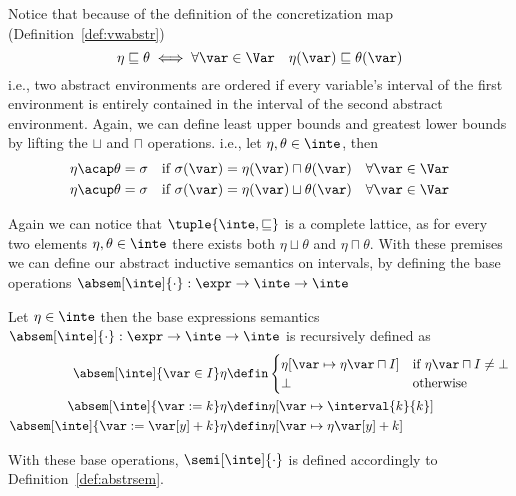 Notice that because of the definition of the concretization map
(Definition~\ref{def:vwabstr})
\begin{equation*}
  \eta \sqsubseteq \theta \iff \forall \var \in \Var \quad \eta(\var) \sqsubseteq \theta(\var)
\end{equation*}
i.e., two abstract environments are ordered if every variable's
interval of the first environment is entirely contained in the
interval of the second abstract environment.  Again, we can define
least upper bounds and greatest lower bounds by lifting the \(\sqcup\)
and \(\sqcap\) operations. i.e., let \(\eta, \theta \in \inte\), then
\begin{align*}
  \eta \acap \theta = \sigma & \quad \text{if } \sigma(\var) = \eta(\var) \sqcap \theta(\var) \quad \forall \var\in\Var \\
  \eta \acup \theta = \sigma & \quad \text{if } \sigma(\var) = \eta(\var) \sqcup \theta(\var) \quad \forall \var\in\Var
\end{align*}

Again we can notice that \(\tuple{\inte, \sqsubseteq}\) is a complete
lattice, as for every two elements \(\eta,\theta\in\inte\) there
exists both \(\eta \sqcup \theta\) and \(\eta \sqcap \theta\).  With
these premises we can define our abstract inductive semantics on
intervals, by defining the base operations
\(\absem[\inte]{\cdot} : \expr \to \inte \to \inte\)

\begin{definition}
  Let \(\eta \in \inte\) then the base expressions semantics
  \(\absem[\inte]{\cdot} : \expr \to \inte \to \inte\) is recursively
  defined as
  \begin{align*}
    \absem[\inte]{\var\in I}\eta & \defin
                                   \begin{cases}
                                     \eta[\var\mapsto\eta\var\sqcap I] & \text{if } \eta\var\sqcap I \neq \bot \\
                                     \bot & \text{otherwise}
                                   \end{cases} \\
    \absem[\inte]{\var := k}\eta & \defin \eta[\var\mapsto\interval{k}{k}] \\
    \absem[\inte]{\var := \var[y] + k}\eta & \defin \eta[\var\mapsto \eta\var[y] + k] \\
  \end{align*}
\end{definition}
With these base operations, \(\semi[\inte]{\cdot}\) is defined
accordingly to Definition~\ref{def:abstrsem}.
